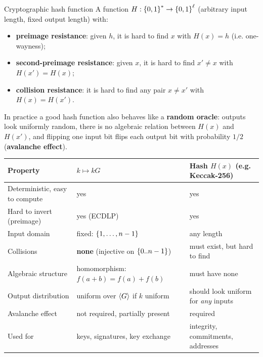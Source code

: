 \begin{frameddefn}[label={def:hash}]{Cryptographic hash function}
  A function $H : \left\{0,1\right\}^* \to \left\{0,1\right\}^\ell$ (arbitrary input length, fixed output length) with:
  \begin{itemize}
    \item \textbf{preimage resistance}: given $h$, it is hard to find $x$ with $H(x) = h$ (i.e. one-wayness);
    \item \textbf{second-preimage resistance}: given $x$, it is hard to find $x' \neq x$ with $H(x') = H(x)$;
    \item \textbf{collision resistance}: it is hard to find any pair $x \neq x'$ with $H(x) = H(x')$.
  \end{itemize}
  In practice a good hash function also behaves like a \textbf{random oracle}: outputs look uniformly random, there is no algebraic relation between $H(x)$ and $H(x')$, and flipping one input bit flips each output bit with probability $1/2$ (\textbf{avalanche effect}).
\end{frameddefn}

\begin{center}
  \small
  \begin{tabularx}{\textwidth}{X X X}
    \toprule
    Property & $k \mapsto kG$ & Hash $H(x)$ (e.g. Keccak-256) \\
    \midrule
    Deterministic, easy to compute & yes & yes \\
    Hard to invert (preimage) & yes (ECDLP) & yes \\
    Input domain & fixed: $\left\{1,\ldots,n-1\right\}$ & any length \\
    Collisions & \textbf{none} (injective on $\left\{0..n-1\right\}$) & must exist, but hard to find \\
    Algebraic structure & homomorphism: $f(a+b) = f(a)+f(b)$ & must have none \\
    Output distribution & uniform over $\left\langle G \right\rangle$ if $k$ uniform & should look uniform for \textit{any} inputs \\
    Avalanche effect & not required, partially present & required \\
    Used for & keys, signatures, key exchange & integrity, commitments, addresses \\
    \bottomrule
  \end{tabularx}
\end{center}



